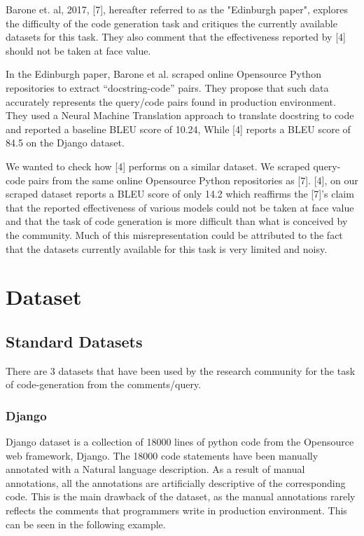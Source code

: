 \documentclass{IEEEtran}
\begin{document}
    Barone et. al, 2017, [7], hereafter referred to as the "Edinburgh paper",
    explores the difficulty of the code generation task and critiques
    the currently available datasets for this task. They also comment that
    the effectiveness reported by [4] should not be taken at face value.

    In the Edinburgh paper, Barone et al. scraped online Opensource Python
    repositories to extract ``docstring-code'' pairs. They propose that
    such data accurately represents the query/code pairs found in
    production environment. They used a Neural Machine Translation
    approach to translate docstring to code and reported a baseline
    BLEU score of 10.24, While [4] reports a BLEU score of 84.5 on the
    Django dataset.

    We wanted to check how [4] performs on a similar dataset.
    We scraped query-code pairs from the same online Opensource Python repositories as [7].
    [4], on our scraped dataset reports a BLEU score of only 14.2 which reaffirms
    the [7]'s claim that the reported effectiveness of various
    models could not be taken at face value and that the task of code generation
    is more difficult than what is conceived by the community.
    Much of this misrepresentation could be attributed to the fact that the
    datasets currently available for this task is very limited and noisy.

    \section{Dataset}
      \subsection{Standard Datasets}
        There are 3 datasets that have been used by the research community for the task
        of code-generation from the comments/query.
        \subsubsection{Django}
        Django dataset is a collection of 18000 lines of python code from the Opensource
        web framework, Django. The 18000 code statements have been manually annotated
        with a Natural language description. As a result of manual annotations, all the
        annotations are artificially descriptive of the corresponding code. This is
        the main drawback of the dataset, as the manual annotations rarely reflects
        the comments that programmers write in production environment. This can be seen
        in the following example.
\end{document}
